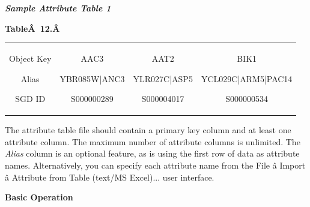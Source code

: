 \emph{\textbf{Sample Attribute Table 1}
}



 \textbf{Table\^A 12.\^A }



\begin{tabular}{|c|c|c|c|}
\hline 
 & & & \\
\hline 

 Object Key


 Alias


 SGD ID
 &

 AAC3


 YBR085W|ANC3


 S000000289
 &

 AAT2


 YLR027C|ASP5


 S000004017
 &

 BIK1


 YCL029C|ARM5|PAC14


 S000000534
 \\
 \hline 

\end{tabular}

 The attribute table file should contain a primary key column and at least one attribute column. The maximum number of attribute columns is unlimited. The \emph{Alias}
 column is an optional feature, as is using the first row of data as attribute names. Alternatively, you can specify each attribute name from the File \^a Import \^a Attribute from Table (text/MS Excel)... user interface. 


 \textbf{Basic Operation}


